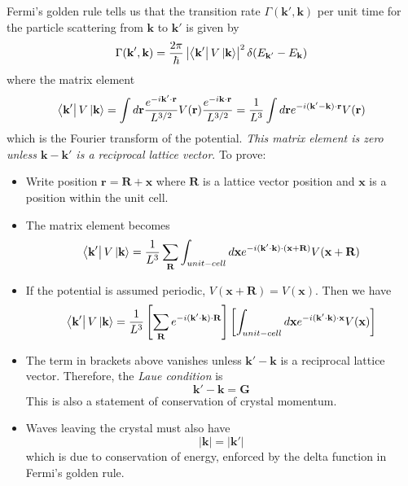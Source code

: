 \documentclass[10pt]{article}
\begin{document}
Fermi's golden rule tells us that the transition rate $\Gamma(\textbf{k}', \textbf{k})$ per unit time for the particle scattering from $\textbf{k}$ to $\textbf{k}'$ is given by
$$
\Gamma(\textbf{k}', \textbf{k}) = \frac{2\pi}{\hbar} \left | \bra{\textbf{k}'}V\ket{\textbf{k}}\right |^{2}\delta(E_{\textbf{k}'} - E_{\textbf{k}})
$$
where the matrix element
$$
\bra{\textbf{k}'}V\ket{\textbf{k}} = \int d\textbf{r} \frac{e^{-i\textbf{k}'\cdot \textbf{r}}}{L^{3/2}}V(\textbf{r})\frac{e^{-i\textbf{k}\cdot \textbf{r}}}{L^{3/2}} = \frac{1}{L^{3}}\int d\textbf{r} e^{-i(\textbf{k}' - \textbf{k})\cdot \textbf{r}}V(\textbf{r})
$$
which is the Fourier transform of the potential. \emph{This matrix element is zero unless $\textbf{k} - \textbf{k}'$ is a reciprocal lattice vector}.
To prove:
\begin{itemize}
  \item Write position $\textbf{r} = \textbf{R} + \textbf{x}$ where $\textbf{R}$ is a lattice vector position and $\textbf{x}$ is a position within the unit cell.
  \item The matrix element becomes
  $$\bra{\textbf{k}'}V\ket{\textbf{k}} = \frac{1}{L^{3}} \sum_{\textbf{R}}\int_{unit-cell} d\textbf{x}e^{-i(\textbf{k}'\cdot\textbf{k})\cdot (\textbf{x} + \textbf{R})}V(\textbf{x} + \textbf{R})$$
  \item If the potential is assumed periodic, $V(\textbf{x} + \textbf{R}) = V(\textbf{x})$. Then we have
  \begin{equation}
    \bra{\textbf{k}'}V\ket{\textbf{k}} = \frac{1}{L^{3}} \left [ \sum_{\textbf{R}} e^{-i(\textbf{k}'\cdot\textbf{k})\cdot\textbf{R}} \right ] \left [ \int_{unit-cell} d\textbf{x}e^{-i(\textbf{k}'\cdot\textbf{k})\cdot\textbf{x}}V(\textbf{x}) \right ]
  \end{equation}
  \item The term in brackets above vanishes unless $\textbf{k}' - \textbf{k}$ is a reciprocal lattice vector. Therefore, the \emph{Laue condition} is
  \begin{equation}
    \boxed{\textbf{k}' - \textbf{k} = \textbf{G}}
  \end{equation}
  This is also a statement of conservation of crystal momentum.
  \item Waves leaving the crystal must also have
  $$|\textbf{k}| = |\textbf{k}'|$$
  which is due to conservation of energy, enforced by the delta function in Fermi's golden rule.
\end{itemize}
\end{document}
